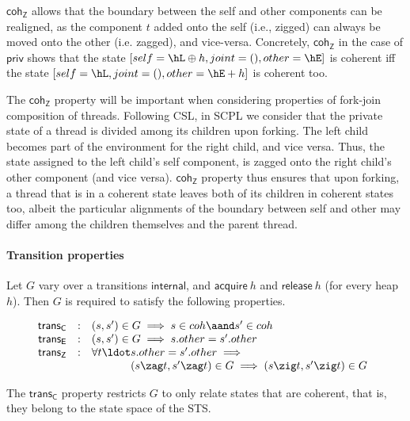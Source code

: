 $\mathsf{coh_Z}$ allows that the boundary between the self and other
components can be realigned, as the component $t$ added onto the self
(i.e., zigged) can always be moved onto the other (i.e. zagged), and
vice-versa.  Concretely, $\mathsf{coh_Z}$ in the case of
$\mathsf{priv}$ shows that the state $[self=\hL \oplus h,
  joint=(),other=\hE]$ is coherent iff the state $[self=\hL,
  joint=(),other=\hE + h]$ is coherent too.

The $\mathsf{coh_Z}$ property will be important when considering
properties of fork-join composition of threads. Following CSL, in SCPL
we consider that the private state of a thread is divided among its
children upon forking. The left child becomes part of the environment
for the right child, and vice versa. Thus, the state assigned to the
left child's self component, is zagged onto the right child's other
component (and vice versa). $\mathsf{coh_Z}$ property thus ensures
that upon forking, a thread that is in a coherent state leaves both of
its children in coherent states too, albeit the particular alignments
of the boundary between self and other may differ among the children
themselves and the parent thread.

\paragraph{Transition properties}

Let $G$ vary over a transitions $\mathsf{internal}$, and
$\mathsf{acquire}\ h$ and $\mathsf{release}\ h$ (for every heap
$h$). Then $G$ is required to satisfy the following properties.

\[
\begin{array}{rcl}
\mathsf{trans_C} & : & (s, s') \in G \implies s \in coh \aand s' \in coh\\
\mathsf{trans_E} & : & (s, s') \in G \implies s.other = s'.other\\
\mathsf{trans_Z} & : & \forall t\ldot \!\!\!\begin{array}[t]{l}
  s.other = s'.other \implies \hbox{}\\
  (s \zag t, s' \zag t) \in G \implies (s \zig t, s' \zig t) \in G
  \end{array}
\end{array}
\]

The $\mathsf{trans_C}$ property restricts $G$ to only relate states
that are coherent, that is, they belong to the state space of the STS.

